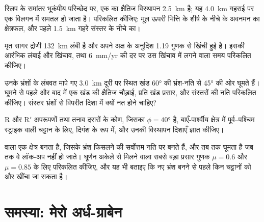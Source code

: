 \begin{exercise}[$\star\star$]\label{exo:b3:extension-strike-slip:8}
स्लिप के समांतर भूकंपीय परिच्छेद पर, एक  का क्षैतिज विस्थापन
\qty{2.5}{km} है; यह \qty{4.0}{km} गहराई पर एक विलगन में समतल हो जाता है। परिकलित
कीजिए: मूल ऊपरी भित्ति के शीर्ष के नीचे के अवनमन का क्षेत्रफल, और
पहले \qty{1.5}{km} गहरे संस्तर के नीचे का।
\end{exercise}

\begin{exercise}[$\star\star$]\label{exo:b3:extension-strike-slip:9}
मृत सागर द्रोणी \qty{132}{km} लंबी है और
अपने अक्ष के अनुदिश 1.19 गुणक से खिंची हुई है। इसकी आरंभिक लंबाई और खिंचाव,
तथा \qty{6}{mm/yr} की दर पर उस खिंचाव में लगने वाला समय परिकलित कीजिए।
\end{exercise}

\begin{exercise}[$\star\star\star$]\label{exo:b3:extension-strike-slip:10}
उनके भ्रंशों के लंबवत मापे गए \qty{3.0}{km} दूरी पर स्थित खंड
\ang{60} की भ्रंश-नति से \ang{45} की ओर घूमते हैं। घूमने से पहले और बाद में एक खंड की
क्षैतिज चौड़ाई, प्रति खंड प्रसार, और संस्तरों की नति परिकलित कीजिए।
संस्तर भ्रंशों से विपरीत दिशा में क्यों नत होने चाहिए?
\end{exercise}

\begin{exercise}[$\star\star\star$]\label{exo:b3:extension-strike-slip:11}
R और R$'$ अपरूपणों तथा तनाव दरारों के कोण,
जिसका $\phi = \ang{40}$ है, बाएँ-पार्श्वीय क्षेत्र में पूर्व--पश्चिम स्ट्राइक वाली चट्टान के लिए,
दिगंश के रूप में, और उनकी विस्थापन दिशाएँ ज्ञात कीजिए।
\end{exercise}

\begin{exercise}[$\star\star\star$]\label{exo:b3:extension-strike-slip:12}
 वाला एक क्षेत्र बनता है, जिसके भ्रंश फिसलने की सर्वोत्तम नति पर बनते हैं, और
तब तक घूमता है जब तक वे लॉक-अप नहीं हो जाते। घूर्णन अकेले से मिलने वाला सबसे बड़ा प्रसार गुणक
$\mu = 0.6$ और $\mu = 0.85$ के लिए परिकलित कीजिए, और यह भी
बताइए कि नए भ्रंश बनने से पहले किन चट्टानों को और खींचा जा सकता है।
\end{exercise}

\section{समस्या: मेरो अर्ध-ग्राबेन}

